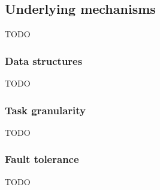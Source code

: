 \subsection{Underlying mechanisms}
TODO

\subsubsection{Data structures}
TODO

\subsubsection{Task granularity}
TODO

\subsubsection{Fault tolerance}
TODO
